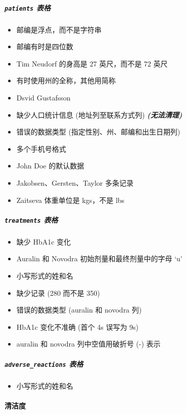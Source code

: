 \documentclass[11pt]{article}
\providecommand{\tightlist}{%
      \setlength{\itemsep}{0pt}\setlength{\parskip}{0pt}}
\begin{document}
\hypertarget{patients-ux8868ux683c}{%
\subparagraph{\texorpdfstring{\texttt{patients}
表格}{patients 表格}}\label{patients-ux8868ux683c}}

\begin{itemize}
\tightlist
\item
  邮编是浮点，而不是字符串
\item
  邮编有时是四位数
\item
  Tim Neudorf 的身高是 27 英尺，而不是 72 英尺
\item
  有时使用州的全称，其他用简称
\item
  Dsvid Gustafsson
\item
  缺少人口统计信息 (地址列至联系方式列) \textbf{\emph{(无法清理)}}
\item
  错误的数据类型 (指定性别、州、邮编和出生日期列)
\item
  多个手机号格式
\item
  John Doe 的默认数据
\item
  Jakobsen、Gersten、Taylor 多条记录
\item
  Zaitseva 体重单位是 kgs，不是 lbs
\end{itemize}

\hypertarget{treatments-ux8868ux683c}{%
\subparagraph{\texorpdfstring{\texttt{treatments}
表格}{treatments 表格}}\label{treatments-ux8868ux683c}}

\begin{itemize}
\tightlist
\item
  缺少 HbA1c 变化
\item
  Auralin 和 Novodra 初始剂量和最终剂量中的字母 `u'
\item
  小写形式的姓和名
\item
  缺少记录 (280 而不是 350)
\item
  错误的数据类型 (auralin 和 novodra 列)
\item
  HbA1c 变化不准确 (首个 4s 误写为 9s)
\item
  auralin 和 novodra 列中空值用破折号 (-) 表示
\end{itemize}

\hypertarget{adverse_reactions-ux8868ux683c}{%
\subparagraph{\texorpdfstring{\texttt{adverse\_reactions}
表格}{adverse\_reactions 表格}}\label{adverse_reactions-ux8868ux683c}}

\begin{itemize}
\tightlist
\item
  小写形式的姓和名
\end{itemize}

\hypertarget{ux6e05ux6d01ux5ea6}{%
\paragraph{清洁度}\label{ux6e05ux6d01ux5ea6}}
\end{document}
